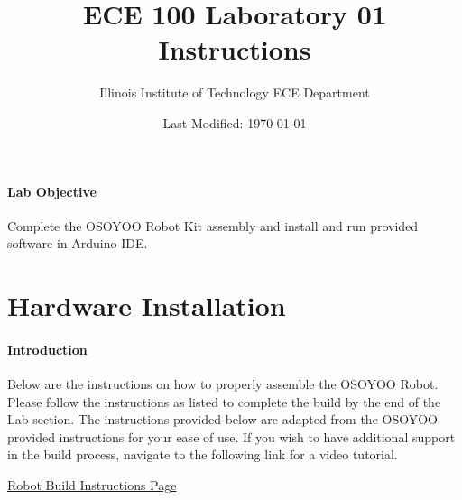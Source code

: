 \documentclass{article}
\title{ECE 100 Laboratory 01 Instructions }
\author{Illinois Institute of Technology ECE Department}
\date{Last Modified: \today}
\begin{document}
	\maketitle
	
	\paragraph{Lab Objective} Complete the OSOYOO Robot Kit assembly and install and run provided software in Arduino IDE. 
	
	\section{Hardware Installation}
	
	\paragraph{Introduction} Below are the instructions on how to properly assemble the OSOYOO Robot. Please follow the instructions as listed to complete the build by the end of the Lab section. The instructions provided below are adapted from the OSOYOO provided instructions for your ease of use. If you wish to have additional support in the build process, navigate to the following link for a video tutorial.
	
	\vspace{1em}
	
	\href{https://osoyoo.com/2020/05/12/osoyoo-v2-1-robot-car-kit-lesson-1-basic-robot-car/}{Robot Build Instructions Page}
	
\end{document}
